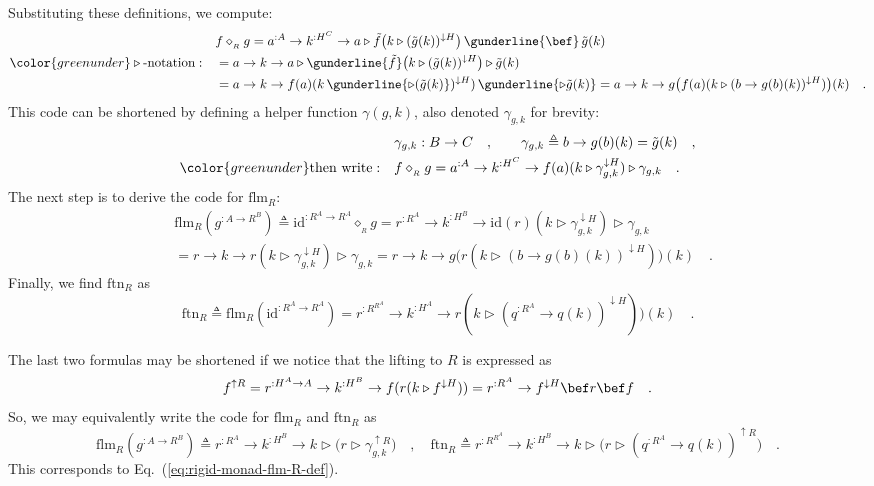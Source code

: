 Substituting these definitions, we compute:
\begin{align*}
 & f\diamond_{_{R}}g=a^{:A}\rightarrow k^{:H^{C}}\rightarrow a\triangleright\tilde{f}\big(k\triangleright(\tilde{g}(k))^{\downarrow H}\big)\,\gunderline{\bef}\,\tilde{g}(k)\\
{\color{greenunder}\triangleright\text{-notation}:}\quad & =a\rightarrow k\rightarrow a\triangleright\gunderline{\tilde{f}}\big(k\triangleright(\tilde{g}(k))^{\downarrow H}\big)\triangleright\tilde{g}(k)\\
 & =a\rightarrow k\rightarrow f(a)(k\,\gunderline{\triangleright(\tilde{g}(k)})^{\downarrow H})\,\gunderline{\triangleright\tilde{g}(k)}=a\rightarrow k\rightarrow g\big(f(a)(k\triangleright(b\rightarrow g(b)(k))^{\downarrow H})\big)(k)\quad.
\end{align*}
This code can be shortened by defining a helper function $\gamma(g,k)$,
also denoted $\gamma_{g,k}$ for brevity:
\begin{align*}
 & \gamma_{g,k}:B\rightarrow C\quad,\quad\quad\gamma_{g,k}\triangleq b\rightarrow g(b)(k)=\tilde{g}(k)\quad,\\
{\color{greenunder}\text{then write}:}\quad & f\diamond_{_{R}}g=a^{:A}\rightarrow k^{:H^{C}}\rightarrow f(a)(k\triangleright\gamma_{g,k}^{\downarrow H})\triangleright\gamma_{g,k}\quad.
\end{align*}
The next step is to derive the code for $\text{flm}_{R}$:
\begin{align*}
 & \text{flm}_{R}(g^{:A\rightarrow R^{B}})\triangleq\text{id}^{:R^{A}\rightarrow R^{A}}\diamond_{_{R}}g=r^{:R^{A}}\rightarrow k^{:H^{B}}\rightarrow\text{id}(r)(k\triangleright\gamma_{g,k}^{\downarrow H})\triangleright\gamma_{g,k}\\
 & =r\rightarrow k\rightarrow r(k\triangleright\gamma_{g,k}^{\downarrow H})\triangleright\gamma_{g,k}=r\rightarrow k\rightarrow g\big(r(k\triangleright(b\rightarrow g(b)(k))^{\downarrow H})\big)(k)\quad.
\end{align*}
Finally, we find $\text{ftn}_{R}$ as
\[
\text{ftn}_{R}\triangleq\text{flm}_{R}(\text{id}^{:R^{A}\rightarrow R^{A}})=r^{:R^{R^{A}}}\rightarrow k^{:H^{A}}\rightarrow r(k\triangleright(q^{:R^{A}}\rightarrow q(k))^{\downarrow H})\big)(k)\quad.
\]

The last two formulas may be shortened if we notice that the lifting
to $R$ is expressed as
\[
f^{\uparrow R}=r^{:H^{A}\rightarrow A}\rightarrow k^{:H^{B}}\rightarrow f(r(k\triangleright f^{\downarrow H}))=r^{:R^{A}}\rightarrow f^{\downarrow H}\bef r\bef f\quad.
\]
So, we may equivalently write the code for $\text{flm}_{R}$ and $\text{ftn}_{R}$
as
\[
\text{flm}_{R}(g^{:A\rightarrow R^{B}})\triangleq r^{:R^{A}}\rightarrow k^{:H^{B}}\rightarrow k\triangleright\big(r\triangleright\gamma_{g,k}^{\uparrow R}\big)\quad,\quad\text{ftn}_{R}\triangleq r^{:R^{R^{A}}}\rightarrow k^{:H^{B}}\rightarrow k\triangleright\big(r\triangleright(q^{:R^{A}}\rightarrow q(k))^{\uparrow R}\big)\quad.
\]
This corresponds to Eq.~(\ref{eq:rigid-monad-flm-R-def}).

